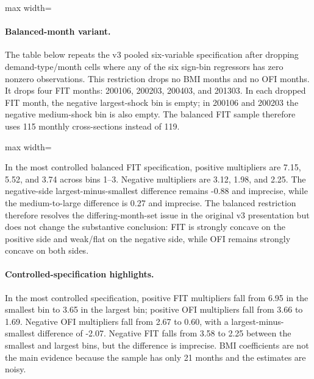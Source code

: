 \documentclass[11pt]{article}
\begin{document}
\begin{table}[H]
\centering
\caption{v3 pooled six-variable asymmetric multipliers by shock-size bin}
\label{tab:v3_asym_multipliers}
\begin{adjustbox}{max width=\textwidth}

\end{adjustbox}
\end{table}

\paragraph{Balanced-month variant.}
The table below repeats the v3 pooled six-variable specification after
dropping demand-type/month cells where any of the six sign-bin regressors has
zero nonzero observations. This restriction drops no BMI months and no OFI
months. It drops four FIT months: 200106, 200203, 200403, and 201303. In each
dropped FIT month, the negative largest-shock bin is empty; in 200106 and
200203 the negative medium-shock bin is also empty. The balanced FIT sample
therefore uses 115 monthly cross-sections instead of 119.

\begin{table}[H]
\centering
\caption{v3 pooled six-variable asymmetric multipliers, balanced sign-bin months}
\label{tab:v3_asym_multipliers_balanced}
\begin{adjustbox}{max width=\textwidth}

\end{adjustbox}
\end{table}

In the most controlled balanced FIT specification, positive multipliers are
7.15, 5.52, and 3.74 across bins 1--3. Negative multipliers are 3.12, 1.98,
and 2.25. The negative-side largest-minus-smallest difference remains -0.88
and imprecise, while the medium-to-large difference is 0.27 and imprecise.
The balanced restriction therefore resolves the differing-month-set issue in
the original v3 presentation but does not change the substantive conclusion:
FIT is strongly concave on the positive side and weak/flat on the negative
side, while OFI remains strongly concave on both sides.

\paragraph{Controlled-specification highlights.}
In the most controlled specification, positive FIT multipliers fall from 6.95
in the smallest bin to 3.65 in the largest bin; positive OFI multipliers fall
from 3.66 to 1.69. Negative OFI multipliers fall from 2.67 to 0.60, with a
largest-minus-smallest difference of -2.07. Negative FIT falls from 3.58 to
2.25 between the smallest and largest bins, but the difference is imprecise.
BMI coefficients are not the main evidence because the sample has only 21
months and the estimates are noisy.
\end{document}
